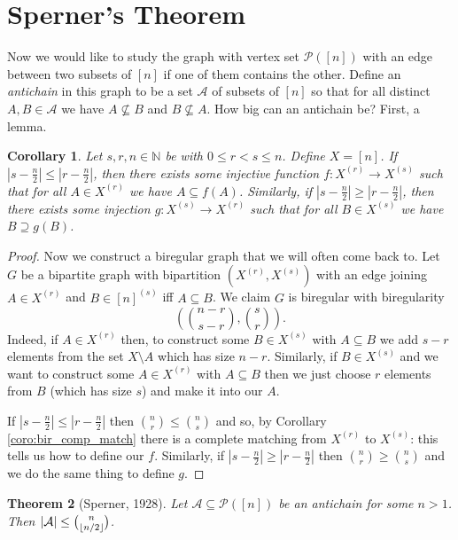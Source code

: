 \documentclass{report}
\DeclarePairedDelimiter\floor{\lfloor}{\rfloor}
\theoremstyle{definition}
\theoremstyle{plain}
\newtheorem{thm}{Theorem}[section]
\newtheorem{coro}[thm]{Corollary}
\theoremstyle{definition}
\begin{document}
 	\section{Sperner's Theorem}
 	Now we would like to study the graph with vertex set $\mathcal{P}([n])$ with an edge between two subsets of $[n]$ if one of them contains the other. Define an \emph{antichain} in this graph to be a set $\mathcal{A}$ of subsets of $[n]$ so that for all distinct $A,B\in \mathcal{A}$ we have $A\nsubseteq B$ and $B\nsubseteq A$. How big can an antichain be? First, a lemma.
 	\begin{coro}\label{coro:one_step_sperner}
 		Let $s,r,n\in\mathbb{N}$ be with $0\leq r<s \leq n$. Define $X = [n]$. If  $|s - \frac{n}{2}| \leq |r-\frac{n}{2}|$, then there exists some injective function $f\colon X^{(r)}\to X^{(s)}$ such that for all $A\in X^{(r)}$ we have $A \subseteq f(A)$. Similarly, if  $|s - \frac{n}{2}| \geq |r-\frac{n}{2}|$, then there exists some injection $g\colon X^{(s)}\to X^{(r)}$ such that for all $B\in X^{(s)}$ we have $B \supseteq g(B)$.
 	\end{coro}
 	\begin{proof}
 		Now we construct a biregular graph that we will often come back to. Let $G$ be a bipartite graph with bipartition $(X^{(r)}, X^{(s)})$ with an edge joining $A\in X^{(r)}$ and $B\in [n]^{(s)}$ iff $A \subseteq B$. We claim $G$ is biregular with biregularity 
 		\[
 		\left(\binom{n-r}{s-r}, \binom{s}{r}\right).
 		\]
 		Indeed, if $A\in X^{(r)}$ then, to construct some $B\in X^{(s)}$ with $A\subseteq B$ we add $s-r$ elements from the set $X\setminus A$ which has size $n-r$. Similarly, if $B\in X^{(s)}$ and we want to construct some $A \in X^{(r)}$ with $A\subseteq B$ then we just choose $r$ elements from $B$ (which has size $s$) and make it into our $A$.
 		
 		If $|s - \frac{n}{2}| \leq |r-\frac{n}{2}|$ then $\binom{n}{r}\leq \binom{n}{s}$ and so, by Corollary \ref{coro:bir_comp_match} there is a complete matching from $X^{(r)}$ to $X^{(s)}$: this tells us how to define our $f$. Similarly, if $|s - \frac{n}{2}| \geq |r-\frac{n}{2}|$ then $\binom{n}{r}\geq \binom{n}{s}$ and we do the same thing to define $g$.
 	\end{proof}
 	\begin{thm}[Sperner, 1928]
 		Let $\mathcal{A}\subseteq \mathcal{P}([n])$ be an antichain for some $n>1$. Then $|\mathcal{A}| \leq \binom{n}{\floor{n/2}}$.
 	\end{thm}
\end{document}
